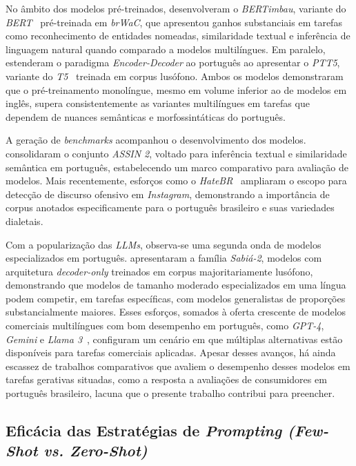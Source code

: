 \documentclass[12pt, a4paper]{article}
\numberwithin{equation}{section}
\begin{document}
No âmbito dos modelos pré-treinados,  desenvolveram o \textit{BERTimbau}, variante do \textit{BERT}~\cite{devlin2018bert} pré-treinada em \textit{brWaC}, que apresentou ganhos substanciais em tarefas como reconhecimento de entidades nomeadas, similaridade textual e inferência de linguagem natural quando comparado a modelos multilíngues. Em paralelo,  estenderam o paradigma \textit{Encoder-Decoder} ao português ao apresentar o \textit{PTT5}, variante do \textit{T5}~\cite{raffel2020Exploring} treinada em corpus lusófono. Ambos os modelos demonstraram que o pré-treinamento monolíngue, mesmo em volume inferior ao de modelos em inglês, supera consistentemente as variantes multilíngues em tarefas que dependem de nuances semânticas e morfossintáticas do português.

A geração de \textit{benchmarks} acompanhou o desenvolvimento dos modelos.  consolidaram o conjunto \textit{ASSIN 2}, voltado para inferência textual e similaridade semântica em português, estabelecendo um marco comparativo para avaliação de modelos. Mais recentemente, esforços como o \textit{HateBR}~\cite{vargas2022hatebr} ampliaram o escopo para detecção de discurso ofensivo em \textit{Instagram}, demonstrando a importância de corpus anotados especificamente para o português brasileiro e suas variedades dialetais.

Com a popularização das \textit{LLMs}, observa-se uma segunda onda de modelos especializados em português.  apresentaram a família \textit{Sabiá-2}, modelos com arquitetura \textit{decoder-only} treinados em corpus majoritariamente lusófono, demonstrando que modelos de tamanho moderado especializados em uma língua podem competir, em tarefas específicas, com modelos generalistas de proporções substancialmente maiores. Esses esforços, somados à oferta crescente de modelos comerciais multilíngues com bom desempenho em português, como \textit{GPT-4}, \textit{Gemini} e \textit{Llama 3}~\cite{achiam2023gpt4,google2024gemini,meta2024llama3}, configuram um cenário em que múltiplas alternativas estão disponíveis para tarefas comerciais aplicadas. Apesar desses avanços, há ainda escassez de trabalhos comparativos que avaliem o desempenho desses modelos em tarefas gerativas situadas, como a resposta a avaliações de consumidores em português brasileiro, lacuna que o presente trabalho contribui para preencher.

\subsection{Eficácia das Estratégias de \textit{Prompting (Few-Shot vs. Zero-Shot)}}
\end{document}
